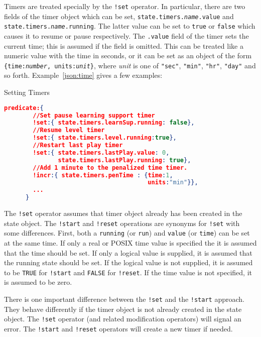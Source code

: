 \documentclass{article}
\begin{document}
  Timers are treated specially by the \texttt{!set} operator.  In
  particular, there are two fields of the timer object which can be
  set, \texttt{state.timers.\textit{name}.value} and
  \texttt{state.timers.\textit{name}.running}.  The latter value can
  be set to \texttt{true} or \texttt{false} which causes it to resume
  or pause respectively.  The \texttt{.value} field of the timer sets
  the current time; this is assumed if the field is omitted.  This can
  be treated like a numeric value with the time in seconds, or it can
  be set as an object of the form \texttt{\{time:\textit{number},
    units:\textit{unit}\}}, where \textit{unit} is one of
  \texttt{"sec"}, \texttt{"min"}, \texttt{"hr"}, \texttt{"day"} and so
  forth.  Example~\ref{json:time} gives a few examples:
  
  \begin{algorithm}
    \caption{Setting Timers}
    \label{json:time}
    \begin{lstlisting}[language=json]
      predicate:{
        //Set pause learning support timer
        !set:{ state.timers.learnSup.running: false},
        //Resume level timer
        !set:{ state.timers.level.running:true},
        //Restart last play timer
        !set:{ state.timers.lastPlay.value: 0,
               state.timers.lastPlay.running: true},
        //Add 1 minute to the penalized time timer.
        !incr:{ state.timers.penTime : {time:1,
                                        units:"min"}},
        ...
      }
    \end{lstlisting}
  \end{algorithm}

  The \texttt{!set} operator assumes that timer object already has
  been created in the state object.    The \texttt{!start} and
  \texttt{!reset} operations are synonyms for 
  \texttt{!set} with some differences.  First, both a \texttt{running} (or
  \texttt{run}) and \texttt{value} (or \texttt{time}) can be set at the same
  time.  If only a real or POSIX time value is specified
  the it is assumed that the time should be set. If only a logical value
  is supplied, it is assumed that the running state should be set.  If
  the logical value is not supplied, it is assumed to be \texttt{TRUE} for
  \texttt{!start} and \texttt{FALSE} for \texttt{!reset}.  If the time
  value is not specified, it is assumed to be zero.

  There is one important difference between the \texttt{!set} and the
  \texttt{!start} approach.  They behave differently if the timer object
  is not already created in the state object. The \texttt{!set} operator
  (and related modification operators) will signal an error.  The
  \texttt{!start} and \texttt{!reset} operators will create a new timer if
  needed.
\end{document}
